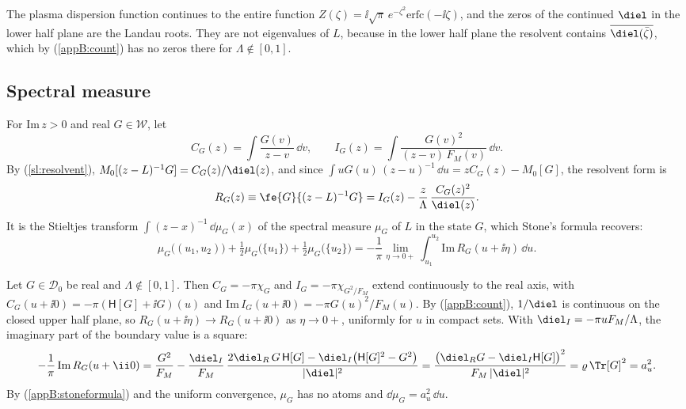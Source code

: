 The plasma dispersion function continues to the entire function $Z(\zeta)=\ii\sqrt\pi\,e^{-\zeta^2}\mathrm{erfc}(-\ii\zeta)$, and the zeros of the continued $\diel$ in the lower half plane are the Landau roots. They are not eigenvalues of $L$, because in the lower half plane the resolvent contains $\overline{\diel(\bar\zeta)}$, which by (\ref{appB:count}) has no zeros there for $\Lambda\notin[0,1]$.

\subsection{Spectral measure}\label{appB:stone}

For $\mathrm{Im}\,z>0$ and real $G\in\mathcal W$, let
\begin{equation*}
  C_G(z)=\int\frac{G(v)}{z-v}\,\dd v,\qquad I_G(z)=\int\frac{G(v)^2}{(z-v)\,F_M(v)}\,\dd v .
\end{equation*}
By (\ref{sl:resolvent}), $M_0[(z-L)^{-1}G]=C_G(z)/\diel(z)$, and since $\int uG(u)\,(z-u)^{-1}\,\dd u=zC_G(z)-M_0[G]$, the resolvent form is
\begin{equation*}
  R_G(z)\equiv\fe{G}{(z-L)^{-1}G}=I_G(z)-\frac{z}{\Lambda}\,\frac{C_G(z)^2}{\diel(z)} .
\end{equation*}
It is the Stieltjes transform $\int(z-x)^{-1}\,\dd\mu_G(x)$ of the spectral measure $\mu_G$ of $L$ in the state $G$, which Stone's formula recovers:
\begin{equation}\label{appB:stoneformula}
  \mu_G\big((u_1,u_2)\big)+\tfrac12\mu_G\big(\{u_1\}\big)+\tfrac12\mu_G\big(\{u_2\}\big)
  =-\frac{1}{\pi}\lim_{\eta\to0+}\int_{u_1}^{u_2}\mathrm{Im}\,R_G(u+\ii\eta)\,\dd u .
\end{equation}

Let $G\in\mathcal D_0$ be real and $\Lambda\notin[0,1]$. Then $C_G=-\pi\chi_G$ and $I_G=-\pi\chi_{G^2/F_M}$ extend continuously to the real axis, with $C_G(u+\ii0)=-\pi(\mathsf H[G]+\ii G)(u)$ and $\mathrm{Im}\,I_G(u+\ii0)=-\pi G(u)^2/F_M(u)$. By (\ref{appB:count}), $1/\diel$ is continuous on the closed upper half plane, so $R_G(u+\ii\eta)\to R_G(u+\ii0)$ as $\eta\to0+$, uniformly for $u$ in compact sets. With $\diel_I=-\pi uF_M/\Lambda$, the imaginary part of the boundary value is a square:
\begin{equation*}
  -\frac{1}{\pi}\,\mathrm{Im}\,R_G(u+\ii0)
  =\frac{G^2}{F_M}-\frac{\diel_I}{F_M}\,\frac{2\diel_R\,G\,\mathsf H[G]-\diel_I\big(\mathsf H[G]^2-G^2\big)}{|\diel|^2}
  =\frac{\big(\diel_RG-\diel_I\mathsf H[G]\big)^2}{F_M\,|\diel|^2}
  =\varrho\,\Tr[G]^2=a_u^2 .
\end{equation*}
By (\ref{appB:stoneformula}) and the uniform convergence, $\mu_G$ has no atoms and $\dd\mu_G=a_u^2\,\dd u$.

